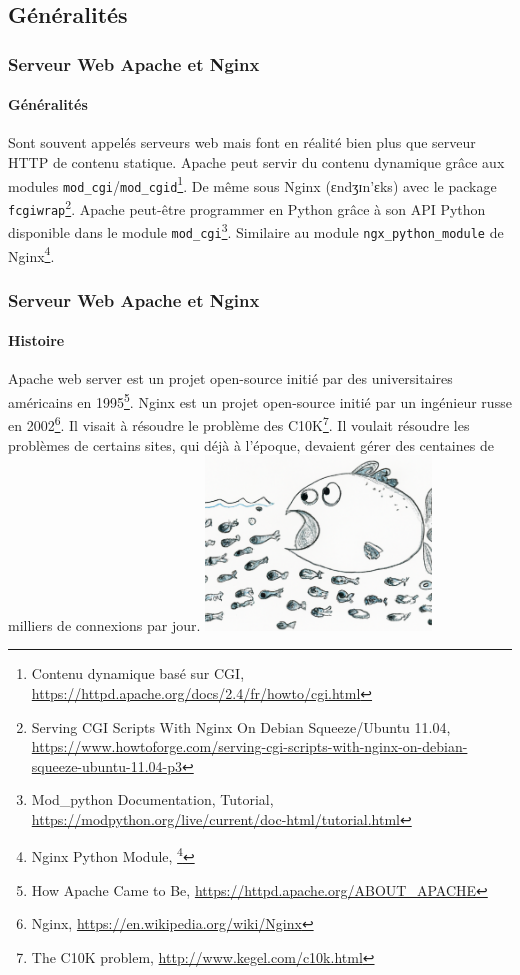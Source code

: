 \documentclass{beamer}
\begin{document}
    \subsection{Généralités}\label{subsec:generalites}
    \begin{frame}
        \transdissolve
        \frametitle{Serveur Web Apache et Nginx}
        \framesubtitle{Généralités}
        Sont souvent appelés serveurs web mais font en réalité bien plus que serveur HTTP de contenu statique.
        \bigbreak
        \setlength\parindent{24pt}Apache peut servir du contenu dynamique grâce aux modules \lstinline{mod_cgi}/\lstinline{mod_cgid}\footnote{Contenu dynamique basé sur CGI, \url{https://httpd.apache.org/docs/2.4/fr/howto/cgi.html}}.
        De même sous Nginx (ɛndʒɪn'ɛks) avec le package \lstinline{fcgiwrap}\footnote{Serving CGI Scripts With Nginx On Debian Squeeze/Ubuntu 11.04, \url{https://www.howtoforge.com/serving-cgi-scripts-with-nginx-on-debian-squeeze-ubuntu-11.04-p3}}.
        \bigbreak
        Apache peut-être programmer en Python grâce à son API Python disponible dans le module \lstinline{mod_cgi}\footnote{Mod\_python Documentation, Tutorial, \url{https://modpython.org/live/current/doc-html/tutorial.html}}.
        Similaire au module \lstinline{ngx_python_module} de Nginx\footnote{Nginx Python Module, \footnote{Nginx Python Module, \url{https://github.com/arut/nginx-python-module}}}.
        \setlength\parindent{0pt}
    \end{frame}

    \begin{frame}
        \transdissolve
        \frametitle{Serveur Web Apache et Nginx}
        \framesubtitle{Histoire}
        Apache web server est un projet open-source initié par des universitaires américains en 1995\footnote{How Apache Came to Be, \url{https://httpd.apache.org/ABOUT_APACHE}}.
        \bigbreak
        Nginx est un projet open-source initié par un ingénieur russe en 2002\footnote{Nginx, \url{https://en.wikipedia.org/wiki/Nginx}}.
        Il visait à résoudre le problème des C10K\footnote{The C10K problem, \url{http://www.kegel.com/c10k.html}}.
        Il voulait résoudre les problèmes de certains sites, qui déjà à l'époque, devaient gérer des centaines de milliers de connexions par jour.
        \bigbreak
        \centering
        \includegraphics[width=6cm]{image/big-fish-eating-many-litlle-fishes}
    \end{frame}
\end{document}
